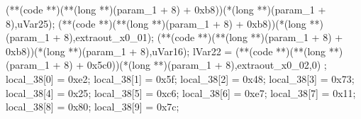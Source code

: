 \documentclass[
]{article}
\newenvironment{Shaded}{}{}
\newcommand{\BaseNTok}[1]{\textcolor[rgb]{0.25,0.63,0.44}{#1}}
\newcommand{\DataTypeTok}[1]{\textcolor[rgb]{0.56,0.13,0.00}{#1}}
\newcommand{\DecValTok}[1]{\textcolor[rgb]{0.25,0.63,0.44}{#1}}
\newcommand{\NormalTok}[1]{#1}
\newcommand{\OperatorTok}[1]{\textcolor[rgb]{0.40,0.40,0.40}{#1}}
\begin{document}
\begin{Shaded}
\begin{Highlighting}[]
  \OperatorTok{(**(}\NormalTok{code }\OperatorTok{**)(**(}\DataTypeTok{long} \OperatorTok{**)(}\NormalTok{param\_1 }\OperatorTok{+} \DecValTok{8}\OperatorTok{)} \OperatorTok{+} \BaseNTok{0xb8}\OperatorTok{))(*(}\DataTypeTok{long} \OperatorTok{**)(}\NormalTok{param\_1 }\OperatorTok{+} \DecValTok{8}\OperatorTok{),}\NormalTok{uVar25}\OperatorTok{);}
  \OperatorTok{(**(}\NormalTok{code }\OperatorTok{**)(**(}\DataTypeTok{long} \OperatorTok{**)(}\NormalTok{param\_1 }\OperatorTok{+} \DecValTok{8}\OperatorTok{)} \OperatorTok{+} \BaseNTok{0xb8}\OperatorTok{))(*(}\DataTypeTok{long} \OperatorTok{**)(}\NormalTok{param\_1 }\OperatorTok{+} \DecValTok{8}\OperatorTok{),}\NormalTok{extraout\_x0\_01}\OperatorTok{);}
  \OperatorTok{(**(}\NormalTok{code }\OperatorTok{**)(**(}\DataTypeTok{long} \OperatorTok{**)(}\NormalTok{param\_1 }\OperatorTok{+} \DecValTok{8}\OperatorTok{)} \OperatorTok{+} \BaseNTok{0xb8}\OperatorTok{))(*(}\DataTypeTok{long} \OperatorTok{**)(}\NormalTok{param\_1 }\OperatorTok{+} \DecValTok{8}\OperatorTok{),}\NormalTok{uVar16}\OperatorTok{);}
\NormalTok{  lVar22 }\OperatorTok{=} \OperatorTok{(**(}\NormalTok{code }\OperatorTok{**)(**(}\DataTypeTok{long} \OperatorTok{**)(}\NormalTok{param\_1 }\OperatorTok{+} \DecValTok{8}\OperatorTok{)} \OperatorTok{+} \BaseNTok{0x5c0}\OperatorTok{))(*(}\DataTypeTok{long} \OperatorTok{**)(}\NormalTok{param\_1 }\OperatorTok{+} \DecValTok{8}\OperatorTok{),}\NormalTok{extraout\_x0\_02}\OperatorTok{,}\DecValTok{0}\OperatorTok{)}
  \OperatorTok{;}
\NormalTok{  local\_38}\OperatorTok{[}\DecValTok{0}\OperatorTok{]} \OperatorTok{=} \BaseNTok{0xe2}\OperatorTok{;}
\NormalTok{  local\_38}\OperatorTok{[}\DecValTok{1}\OperatorTok{]} \OperatorTok{=} \BaseNTok{0x5f}\OperatorTok{;}
\NormalTok{  local\_38}\OperatorTok{[}\DecValTok{2}\OperatorTok{]} \OperatorTok{=} \BaseNTok{0x48}\OperatorTok{;}
\NormalTok{  local\_38}\OperatorTok{[}\DecValTok{3}\OperatorTok{]} \OperatorTok{=} \BaseNTok{0x73}\OperatorTok{;}
\NormalTok{  local\_38}\OperatorTok{[}\DecValTok{4}\OperatorTok{]} \OperatorTok{=} \BaseNTok{0x25}\OperatorTok{;}
\NormalTok{  local\_38}\OperatorTok{[}\DecValTok{5}\OperatorTok{]} \OperatorTok{=} \BaseNTok{0xc6}\OperatorTok{;}
\NormalTok{  local\_38}\OperatorTok{[}\DecValTok{6}\OperatorTok{]} \OperatorTok{=} \BaseNTok{0xe7}\OperatorTok{;}
\NormalTok{  local\_38}\OperatorTok{[}\DecValTok{7}\OperatorTok{]} \OperatorTok{=} \BaseNTok{0x11}\OperatorTok{;}
\NormalTok{  local\_38}\OperatorTok{[}\DecValTok{8}\OperatorTok{]} \OperatorTok{=} \BaseNTok{0x80}\OperatorTok{;}
\NormalTok{  local\_38}\OperatorTok{[}\DecValTok{9}\OperatorTok{]} \OperatorTok{=} \BaseNTok{0x7c}\OperatorTok{;}

\end{Highlighting}
\end{Shaded}
\end{document}
